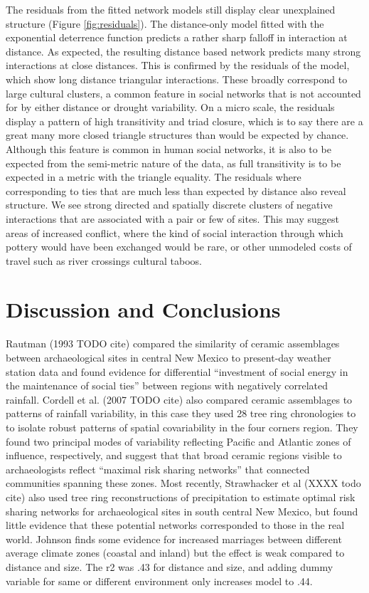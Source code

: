 \documentclass[fleqn,10pt]{wlscirep}
\begin{document}
The residuals from the fitted network models still display clear unexplained structure (Figure \ref{fig:residuals}). The distance-only model fitted with the exponential deterrence function predicts a rather sharp falloff in interaction at distance. As expected, the resulting distance based network predicts many strong interactions at close distances. This is confirmed by the residuals of the model, which show long distance triangular interactions. These broadly correspond to large cultural clusters, a common feature in social networks that is not accounted for by either distance or drought variability. On a micro scale, the residuals display a pattern of high transitivity and triad closure, which is to say there are a great many more closed triangle structures than would be expected by chance. Although this feature is common in human social networks, it is also to be expected from the semi-metric nature of the data, as full transitivity is to be expected in a metric with the triangle equality. The residuals where corresponding to ties that are much less than expected by distance also reveal structure. We see strong directed and spatially discrete clusters of negative interactions that are associated with a pair or few of sites. This may suggest areas of increased conflict, where the kind of social interaction through which pottery would have been exchanged would be rare, or other unmodeled costs of travel such as river crossings cultural taboos. 



\section*{Discussion and Conclusions}
Rautman (1993 TODO cite) compared the similarity of ceramic assemblages between archaeological sites in central New Mexico to present-day weather station data and found evidence for differential ``investment of social energy in the maintenance of social ties'' between regions with negatively correlated rainfall. Cordell et al. (2007 TODO cite) also compared ceramic assemblages to patterns of rainfall variability, in this case they used 28 tree ring chronologies to to isolate robust patterns of spatial covariability in the four corners region. They found two principal modes of variability reflecting Pacific and Atlantic zones of influence, respectively, and suggest that that broad ceramic regions visible to archaeologists reflect ``maximal risk sharing networks'' that connected communities spanning these zones. Most recently, Strawhacker et al (XXXX todo cite) also used tree ring reconstructions of precipitation to estimate optimal risk sharing networks for archaeological sites in south central New Mexico, but found little evidence that these potential networks corresponded to those in the real world. Johnson finds some evidence for increased marriages between different average climate zones (coastal and inland) but the effect is weak compared to distance and  size. The r2 was .43 for distance and size, and adding dummy variable for same or different environment only increases model to .44.
\end{document}
